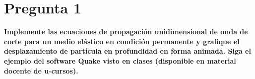 \section{Pregunta 1}

\textbf{Implemente las ecuaciones de propagación unidimensional de onda de corte para un medio elástico en condición permanente y grafique el desplazamiento de partícula en profundidad en forma animada. Siga el ejemplo del software Quake visto en clases (disponible en material docente de u-cursos).}
